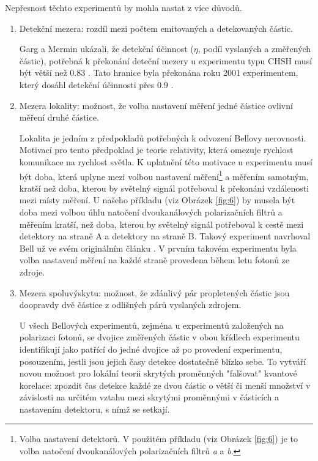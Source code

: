 Nepřesnost těchto experimentů by mohla nastat z více důvodů.
\begin{enumerate}
        \item Detekční mezera: rozdíl mezi počtem emitovaných a detekovaných částic. 

        Garg a Mermin ukázali, že detekční účinnost ($\eta$, podíl vyslaných a změřených částic), potřebná k překonání deteční mezery u experimentu typu CHSH musí být větší než $0.83$ \parencite*{det.efficiency}. Tato hranice byla překonána roku 2001 experimentem, který dosáhl detekční účinnosti přes $0.9$ \parencite{belltest:2001}.

        \item Mezera lokality: možnost, že volba nastavení měření jedné částice ovlivní měření druhé částice.

        Lokalita je jedním z předpokladů potřebných k odvození Bellovy nerovnosti. Motivací pro tento předpoklad je teorie relativity, která omezuje rychlost komunikace na rychlost světla. K uplatnění této motivace u experimentu musí být doba, která uplyne mezi volbou nastavení měření\footnote[3]{Volba nastavení detektorů. V použitém příkladu (viz Obrázek \ref{fig:6}) je to volba natočení dvoukanálových polarizačních filtrů \emph{a} a \emph{b}.} a měřením samotným, kratší než doba, kterou by světelný signál potřeboval k překonání vzdálenosti mezi místy měření. U našeho příkladu (viz Obrázek \ref{fig:6}) by musela být doba mezi volbou úhlu natočení dvoukanálových polarizačních filtrů a měřením kratší, než doba, kterou by světelný signál potřeboval k cestě mezi detektory na straně A a detektory na straně B. Takový experiment navrhoval Bell už ve svém originálním článku \parencite*{bellineq}. V prvním takovém experimentu \parencite{belltest:2} byla volba nastavení měření na každé straně provedena během letu fotonů ze zdroje.

        \item Mezera spoluvýskytu: možnost, že zdánlivý pár propletených částic jsou doopravdy dvě částice z odlišných párů vyslaných zdrojem.
        
        U všech Bellových experimentů, zejména u experimentů založených na polarizaci fotonů, se dvojice změřených částic v obou křídlech experimentu identifikují jako patřící do jedné dvojice až po provedení experimentu, posouzením, jestli jsou jejich časy detekce dostatečně blízko sebe. To vytváří novou možnost pro lokální teorii skrytých proměnných "falšovat" kvantové korelace: zpozdit čas detekce každé ze dvou částic o větší či menší množství v závislosti na určitém vztahu mezi skrytými proměnnými v částicích a nastavením detektoru, s nímž se setkají.


\end{enumerate}

